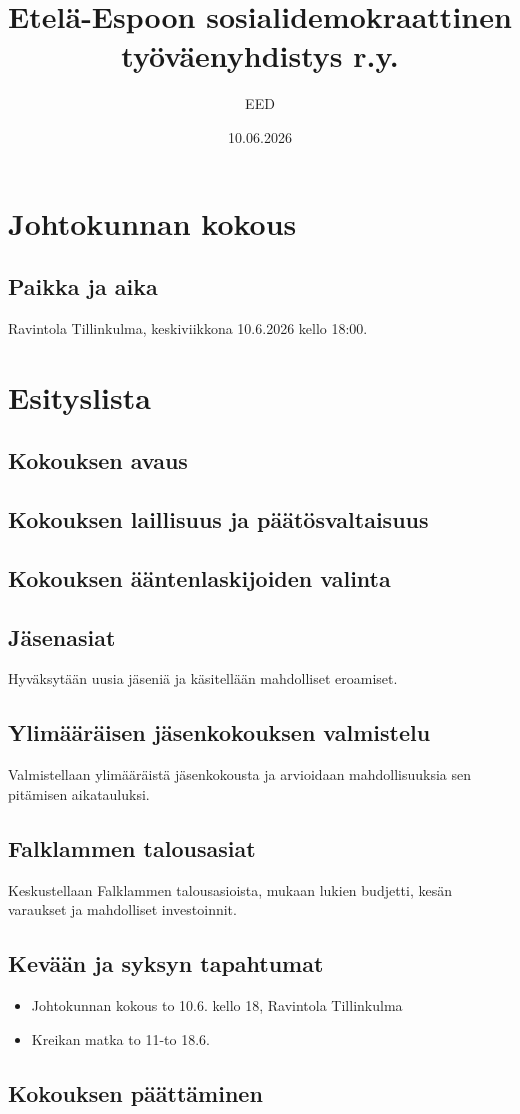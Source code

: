 \documentclass[a4paper,12pt]{article}
\title{Etelä-Espoon sosialidemokraattinen työväenyhdistys r.y.}
\author{EED}
\date{10.06.2026}
\begin{document}
\maketitle
\tableofcontents
\section*{Johtokunnan kokous}
\subsection*{Paikka ja aika}
Ravintola Tillinkulma, keskiviikkona 10.6.2026 kello 18:00.
\section*{Esityslista}
\subsection{Kokouksen avaus}
\subsection{Kokouksen laillisuus ja päätösvaltaisuus}
\subsection{Kokouksen ääntenlaskijoiden valinta}
\subsection{Jäsenasiat}
Hyväksytään uusia jäseniä ja käsitellään mahdolliset eroamiset.
\subsection{Ylimääräisen jäsenkokouksen valmistelu}
Valmistellaan ylimääräistä jäsenkokousta ja arvioidaan mahdollisuuksia sen
pitämisen aikatauluksi.
\subsection{Falklammen talousasiat}
Keskustellaan Falklammen talousasioista, mukaan lukien budjetti, kesän
varaukset ja mahdolliset investoinnit.
\subsection{Kevään ja syksyn tapahtumat}
\begin{itemize}
\item{Johtokunnan kokous} to 10.6. kello 18, Ravintola Tillinkulma
\item{Kreikan matka} to 11-to 18.6.
\end{itemize}
\subsection{Kokouksen päättäminen}
\end{document}
